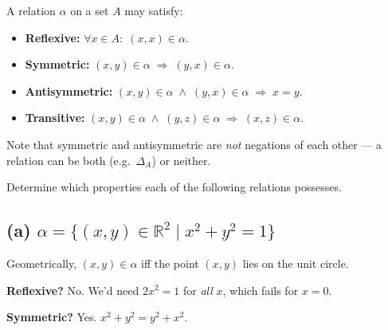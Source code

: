 \documentclass[12pt, a4paper]{article}
\newcommand{\R}{\mathbb{R}}
\begin{document}
\begin{theorybox}
A relation $\alpha$ on a set $A$ may satisfy:
\begin{itemize}[nosep]
  \item \textbf{Reflexive:} $\forall x \in A:\; (x,x) \in \alpha$.
  \item \textbf{Symmetric:} $(x,y) \in \alpha \;\Rightarrow\; (y,x) \in \alpha$.
  \item \textbf{Antisymmetric:} $(x,y) \in \alpha \;\land\; (y,x) \in \alpha \;\Rightarrow\; x = y$.
  \item \textbf{Transitive:} $(x,y) \in \alpha \;\land\; (y,z) \in \alpha \;\Rightarrow\; (x,z) \in \alpha$.
\end{itemize}
Note that symmetric and antisymmetric are \emph{not} negations of each other --- a relation can be both (e.g.\ $\Delta_A$) or neither.
\end{theorybox}

\begin{problembox}
Determine which properties each of the following relations possesses.
\end{problembox}

\subsection*{(a)\; $\alpha = \{(x,y) \in \R^2 \mid x^2 + y^2 = 1\}$}

Geometrically, $(x,y) \in \alpha$ iff the point $(x,y)$ lies on the unit circle.

\begin{center}
\end{center}

\textbf{Reflexive?} No.  We'd need $2x^2 = 1$ for \emph{all} $x$, which fails for $x = 0$.

\textbf{Symmetric?} Yes.  $x^2 + y^2 = y^2 + x^2$. \checkmark
\end{document}
